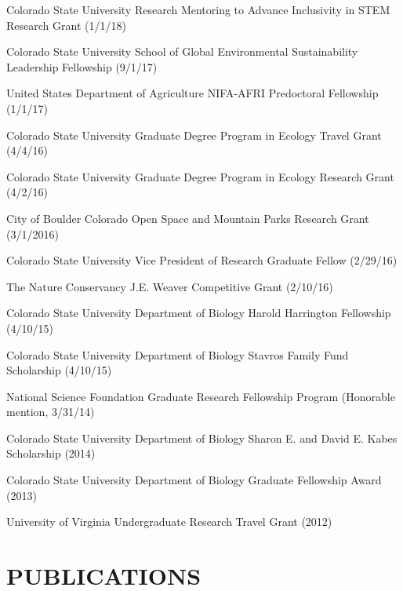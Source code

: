 \documentclass{cv}
\begin{document}
Colorado State University Research Mentoring to Advance Inclusivity in STEM Research Grant (1/1/18) %

Colorado State University School of Global Environmental Sustainability Leadership Fellowship (9/1/17) 

United States Department of Agriculture NIFA-AFRI Predoctoral Fellowship (1/1/17) %

Colorado State University Graduate Degree Program in Ecology Travel Grant (4/4/16) %

Colorado State University Graduate Degree Program in Ecology Research Grant (4/2/16) %

City of Boulder Colorado Open Space and Mountain Parks Research Grant (3/1/2016) %

Colorado State University Vice President of Research Graduate Fellow (2/29/16) %

The Nature Conservancy J.E. Weaver Competitive Grant (2/10/16) %

Colorado State University Department of Biology Harold Harrington Fellowship (4/10/15) %

Colorado State University Department of Biology Stavros Family Fund Scholarship (4/10/15) %

National Science Foundation Graduate Research Fellowship Program (Honorable mention, 3/31/14) 

Colorado State University Department of Biology Sharon E. and David E. Kabes Scholarship (2014) %

Colorado State University Department of Biology Graduate Fellowship Award (2013) %

University of Virginia Undergraduate Research Travel Grant (2012) %




\section*{PUBLICATIONS}
\end{document}
